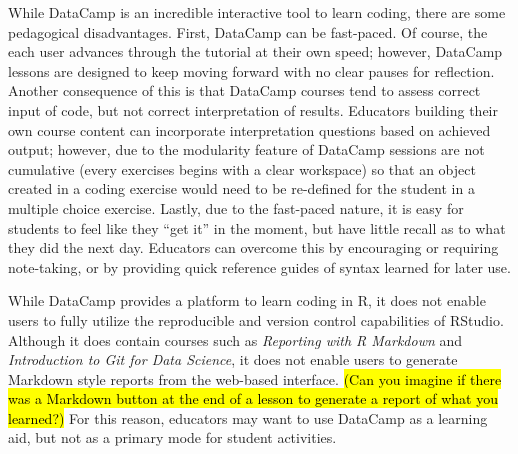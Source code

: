\documentclass{tise_style_doi}
\begin{document}
While DataCamp is an incredible interactive tool to learn coding, there are some
pedagogical disadvantages. First, DataCamp can be fast-paced. Of course, the
each user advances through the tutorial at their own speed; however, DataCamp
lessons are designed to keep moving forward with no clear pauses for reflection.
Another consequence of this is that DataCamp courses tend to assess correct
input of code, but not correct interpretation of results. Educators building
their own course content can incorporate interpretation questions based on
achieved output; however, due to the modularity feature of DataCamp sessions
are not cumulative (every exercises begins with a clear workspace) so that
an object created in a coding exercise would need to be re-defined for the student
in a multiple choice exercise. Lastly, due to the fast-paced nature, it is easy
for students to feel like they ``get it'' in the moment, but have little
recall as to what they did the next day. Educators can overcome this by
encouraging or requiring note-taking, or by providing quick reference guides
of syntax learned for later use.

While DataCamp provides a platform to learn coding in R, it does not enable
users to fully utilize the reproducible and version control capabilities
of RStudio. Although it does contain courses such as
\emph{Reporting with R Markdown} and \emph{Introduction to Git for Data Science},
it does not enable users to generate Markdown style reports from the web-based
interface. \hl{(Can you imagine if there was a Markdown button at the end of a lesson
to generate a report of what you learned?)} For this reason, educators may
want to use DataCamp as a learning aid, but not as a primary mode for
student activities.
\end{document}
